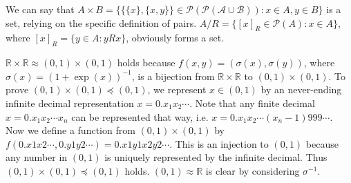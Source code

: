 \documentclass[12pt]{article}
\theoremstyle{definition}
\newenvironment{customthm}[1]
  {\renewcommand\theinnercustomthm{#1}\innercustomthm}
  {\endinnercustomthm}
\begin{document}
\begin{customthm}{I.10.5} We can say that $A\times B=\{\{\{x\},\{x,y\}\}\in\mathcal{P(\mathcal{P(A\cup B)})}:x\in A,y\in B\}$ is a set, relying on the specific definition of pairs. $A/R=\{[x]_R\in\mathcal{P}(A):x\in A\}$, where $[x]_R=\{y\in A:yRx\}$, obviously forms a set.
\end{customthm}

\begin{customthm}{I.11.3} $\mathbb{R}\times\mathbb{R}\approx(0,1)\times(0,1)$ holds because $f(x,y)=(\sigma(x),\sigma(y))$, where $\sigma(x)=(1+\exp(x))^{-1}$, is a bijection from $\mathbb{R}\times\mathbb{R}$ to $(0,1)\times(0,1)$.
To prove $(0,1)\times(0,1)\preceq(0,1)$, we represent $x\in(0,1)$ by an never-ending infinite decimal representation $x=0.x_1x_2\cdots$. Note that any finite decimal $x=0.x_1x_2\cdots x_n$ can be represented that way, i.e. $x=0.x_1x_2\cdots(x_n-1)999\cdots$.
Now we define a function from $(0,1)\times(0,1)$ by $f(0.x1x2\cdots, 0.y1y2\cdots) = 0.x1y1x2y2\cdots$. This is an injection to $(0,1)$ because any number in $(0,1)$ is uniquely represented by the infinite decimal. Thus $(0,1)\times(0,1)\preceq(0,1)$ holds. $(0,1)\approx\mathbb{R}$ is clear by considering $\sigma^{-1}$.
\end{customthm}
\end{document}
